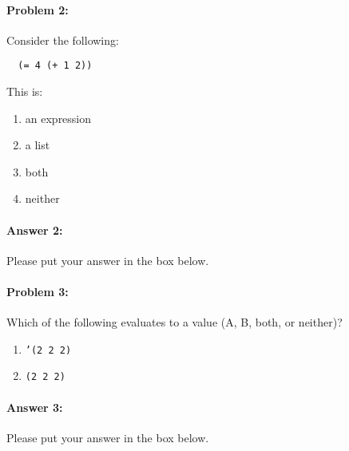 \documentclass[10pt]{article}
\newenvironment{AnswerBox}{\begin{mdframed}[style=simple]}{\end{mdframed}}
\begin{document}
\noindent\hrulefill%

\paragraph{Problem 2:} Consider the following:
\begin{lstlisting}
  (= 4 (+ 1 2))
\end{lstlisting}
This is:
\begin{enumerate}[nosep, label=\Alph*.]
  \item an expression
  \item a list
  \item both
  \item neither
\end{enumerate}

\paragraph{Answer 2:} Please put your answer in the box below.

\begin{AnswerBox}%


\end{AnswerBox}%

\hrulefill%

\paragraph{Problem 3:} Which of the following evaluates to a value (A, B, both,
or neither)?

\begin{enumerate}[nosep, label=\Alph*.]
  \item \texttt{'(2 2 2)}
  \item \texttt{(2 2 2)}
\end{enumerate}

\paragraph{Answer 3:} Please put your answer in the box below.

\begin{AnswerBox}%


\end{AnswerBox}%
\end{document}
